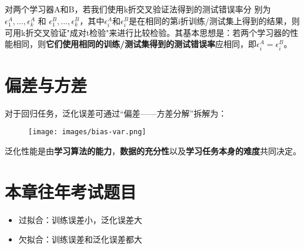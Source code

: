 
对两个学习器A和B，若我们使用k折交叉验证法得到的测试错误率分
别为 $ \epsilon_{1}^{A}, \ldots, \epsilon_{k}^{A} $ 和 $ \epsilon_{1}^{B}, \ldots, \epsilon_{k}^{B} $，其中$ \epsilon_i^A$和$\epsilon_i^B$是在相同的第i折训练/测试集上得到的结果，则可用k折交叉验证"成对t检验"来进行比较检验。其基本思想是：若两个学习器的性能相同，则\textbf{它们使用相同的训练/测试集得到的测试错误率}应相同，即$\epsilon_i^A=\epsilon_i^B$。


\section{偏差与方差}\label{sec:2.5}
对于回归任务，泛化误差可通过“偏差——方差分解”拆解为：
\begin{figure}[!htbp]
	\centering
	{\texttt{[image: images/bias-var.png]}}
\end{figure}

\begin{Keynote}
泛化性能是由\textbf{学习算法的能力}，\textbf{数据的充分性}以及\textbf{学习任务本身的难度}共同决定。
\end{Keynote}

\section{本章往年考试题目}\label{sec:2.6}
\begin{itemize}
    \item 过拟合：训练误差小，泛化误差大
    \item 欠拟合：训练误差和泛化误差都大
\end{itemize}

